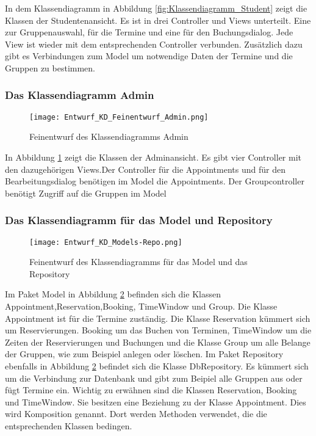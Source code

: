 \documentclass[a4paper,10pt]{article}
\begin{document}
 In dem Klassendiagramm in Abbildung \ref{fig:Klassendiagramm_Student} zeigt die Klassen der Studentenansicht. Es ist in drei Controller und Views unterteilt. Eine zur Gruppenauswahl, für die Termine und eine für den Buchungsdialog.
 Jede View ist wieder mit dem entsprechenden Controller verbunden. Zusätzlich dazu gibt es Verbindungen zum Model um notwendige Daten der Termine und die Gruppen zu bestimmen.
 \subsubsection{Das Klassendiagramm Admin}
 \begin{figure}
  \texttt{[image: Entwurf\_KD\_Feinentwurf\_Admin.png]}
  \label{fig:Klassendiagramm_Admin}
  \caption{Feinentwurf des Klassendiagramms Admin}
 \end{figure} 

 In Abbildung \ref{fig:Klassendiagramm_Admin} zeigt die Klassen der Adminansicht. Es gibt vier Controller mit den dazugehörigen Views.Der Controller für die Appointments und für den Bearbeitungsdialog benötigen im Model die Appointments. Der Groupcontroller benötigt Zugriff auf die Gruppen im Model
 \subsubsection{Das Klassendiagramm für das Model und Repository}
 
 \begin{figure}
  \texttt{[image: Entwurf\_KD\_Models-Repo.png]}
  \label{fig:Klassendiagramm_Models-Repo}
\caption{Feinentwurf des Klassendiagramms für das Model und das Repository}
 \end{figure} 

Im Paket Model in Abbildung \ref{fig:Klassendiagramm_Models-Repo} befinden sich die Klassen Appointment,Reservation,Booking, TimeWindow und Group. Die Klasse Appointment ist für die Termine zuständig. Die Klasse Reservation kümmert sich um Reservierungen. Booking um das Buchen von Terminen, TimeWindow um die Zeiten der Reservierungen und Buchungen und die Klasse Group um alle Belange der Gruppen, wie zum Beispiel anlegen oder löschen.
Im Paket Repository ebenfalls in Abbildung \ref{fig:Klassendiagramm_Models-Repo} befindet sich die Klasse DbRepository. Es kümmert sich um die Verbindung zur Datenbank und gibt zum Beipiel alle Gruppen aus oder fügt Termine ein.
Wichtig zu erw\"ahnen sind die Klassen Reservation, Booking und TimeWindow. Sie besitzen eine Beziehung zu der Klasse Appointment. Dies wird Komposition genannt. Dort werden Methoden verwendet, die die entsprechenden Klassen bedingen.
\end{document}
